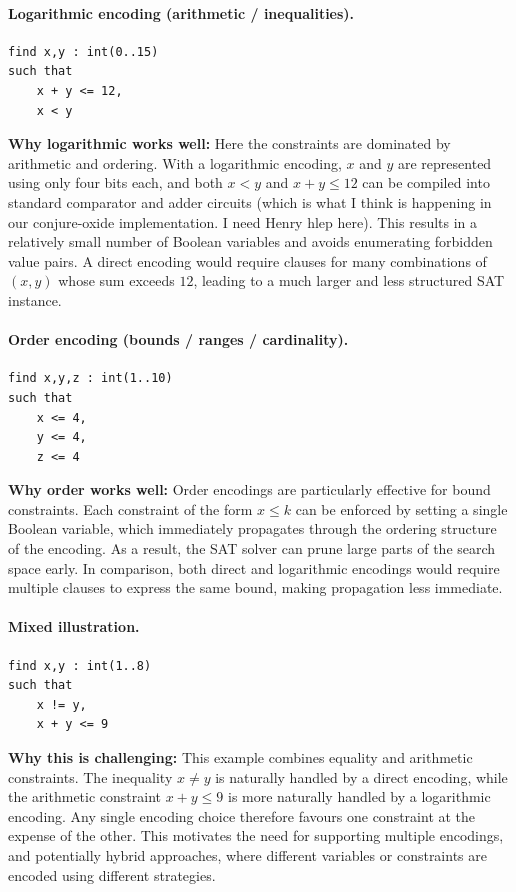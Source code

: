 \paragraph{Logarithmic encoding (arithmetic / inequalities).}
\begin{verbatim}
find x,y : int(0..15)
such that
    x + y <= 12,
    x < y
\end{verbatim}

\noindent
\textbf{Why logarithmic works well:}
Here the constraints are dominated by arithmetic and ordering.
With a logarithmic encoding, $x$ and $y$ are represented using only four bits each, and both
$x < y$ and $x + y \le 12$ can be compiled into standard comparator and adder circuits (which is what I think is happening in our conjure-oxide implementation. I need Henry hlep here).
This results in a relatively small number of Boolean variables and avoids enumerating forbidden
value pairs.
A direct encoding would require clauses for many combinations of $(x,y)$ whose sum exceeds $12$,
leading to a much larger and less structured SAT instance.

\paragraph{Order encoding (bounds / ranges / cardinality).}
\begin{verbatim}
find x,y,z : int(1..10)
such that
    x <= 4,
    y <= 4,
    z <= 4
\end{verbatim}

\noindent
\textbf{Why order works well:}
Order encodings are particularly effective for bound constraints.
Each constraint of the form $x \le k$ can be enforced by setting a single Boolean variable,
which immediately propagates through the ordering structure of the encoding.
As a result, the SAT solver can prune large parts of the search space early.
In comparison, both direct and logarithmic encodings would require multiple clauses to express
the same bound, making propagation less immediate.

\paragraph{Mixed illustration.}
\begin{verbatim}
find x,y : int(1..8)
such that
    x != y,
    x + y <= 9
\end{verbatim}

\noindent
\textbf{Why this is challenging:}
This example combines equality and arithmetic constraints.
The inequality $x \neq y$ is naturally handled by a direct encoding, while the arithmetic constraint
$x + y \le 9$ is more naturally handled by a logarithmic encoding.
Any single encoding choice therefore favours one constraint at the expense of the other.
This motivates the need for supporting multiple encodings, and potentially hybrid approaches,
where different variables or constraints are encoded using different strategies.